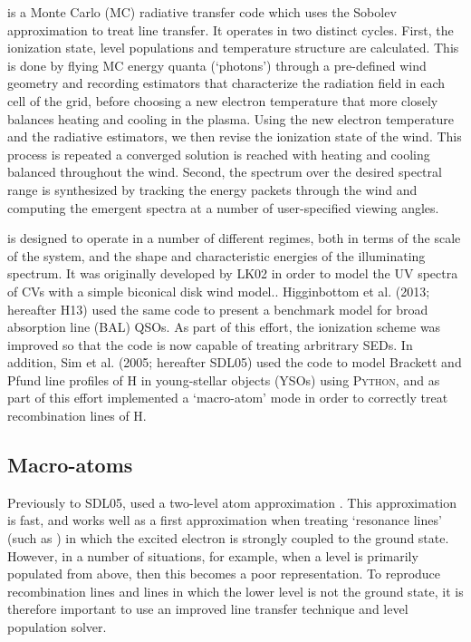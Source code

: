 \documentclass[preprint, a4paper, 11pt]{aastex}
\begin{document}
{\py is a Monte Carlo (MC) radiative transfer code which uses
the Sobolev approximation to treat line transfer. It operates 
in two distinct cycles. First, the ionization state, level populations
and temperature structure are calculated. This is done by
flying MC energy quanta (`photons') through a pre-defined wind geometry and recording
estimators that characterize the radiation field in each cell of the grid, before choosing  a new electron temperature 
that more closely balances heating and cooling in the plasma. Using the new electron temperature and the radiative estimators, we then
revise the ionization state of the wind.  
This process is repeated  a converged
solution is reached with heating and cooling balanced throughout the wind. Second, the spectrum over the desired spectral range is synthesized by tracking
the energy packets through the wind and computing the 
emergent spectra at a number of user-specified viewing angles.

\py is designed to operate in a number of different
regimes, both in terms of the scale of the system, and the 
shape and characteristic energies of the illuminating spectrum. 
It was originally developed by LK02 in order to model the UV spectra
of CVs with a simple biconical disk wind model.. 
Higginbottom et al.\nocite{higginbottom2013} (2013; hereafter H13) used the same code to
present a benchmark model for broad absorption line (BAL) QSOs.
As part of this effort, the ionization scheme was improved so that 
the code is now capable of treating arbritrary SEDs.
In addition, Sim et al. (2005; hereafter SDL05)\nocite{simmacro2005} used the code to model
Brackett and Pfund line profiles of H in young-stellar objects (YSOs) using \textsc{Python,} and as part of this effort 
implemented a `macro-atom' mode  in order to correctly treat recombination lines of H.



\subsection{Macro-atoms}

Previously to SDL05, \py used a two-level atom approximation \cite[see e.g.][]{mihalas}. This approximation is 
fast, and works well as a first approximation when treating  `resonance lines' (such as \civfull) 
in which the excited electron is strongly coupled to the ground state.
However, in a number of situations, for example, when a level is primarily populated from above, then
this becomes a poor representation. 
To reproduce recombination lines and lines in which the lower level is not the ground state, 
it is therefore important to use an improved line transfer technique and level population solver.

}
\end{document}
